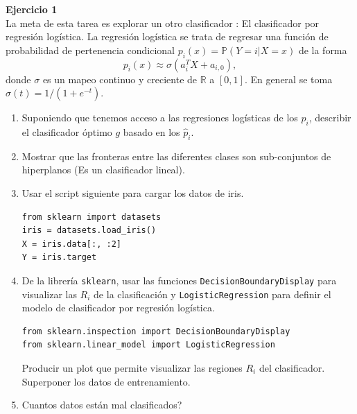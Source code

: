 \documentclass[a4paper, 11pt]{article}
\newenvironment{problem}[2][Ejercicio]
{ \begin{mdframed}[backgroundcolor= red!50] \textbf{#1 #2} \\}
	{  \end{mdframed}}
\newcommand{\prob}[1]{\mathbb{P}\left(#1\right)} %
\newcommand{\R}{\mathbb{R}} %
\begin{document}
	\setlength{\parskip}{\medskipamount}
	\setlength{\parindent}{0pt}
 

\begin{problem}{1}
La meta de esta tarea es explorar un otro clasificador : El clasificador por regresión logística. La regresión logística se trata de regresar una función de probabilidad de pertenencia condicional $p_i(x)=\prob{Y=i|X=x}$ de la forma
\[
p_i(x) \approx \sigma (a^T_{i}X+a_{i,0}),
\]
donde $\sigma$ es un mapeo continuo y creciente de $\R$ a $[0,1]$. En general se toma $\sigma(t)=1/(1+e^{-t})$.
\begin{enumerate}
    \item Suponiendo que tenemos acceso a las regresiones logísticas de los $p_i$, describir el clasificador óptimo $g$ basado en los $\hat{p}_i$.
    \item Mostrar que las fronteras entre las diferentes clases son sub-conjuntos de hiperplanos (Es un clasificador lineal).
    \item Usar el script siguiente para cargar los datos de iris.
    \begin{lstlisting}
from sklearn import datasets
iris = datasets.load_iris()
X = iris.data[:, :2]
Y = iris.target
    \end{lstlisting}
    \item De la librería \texttt{sklearn}, usar las funciones \texttt{DecisionBoundaryDisplay} para visualizar las $R_i$ de la clasificación y \texttt{LogisticRegression} para definir el modelo de clasificador por regresión logística.
    \begin{lstlisting}
from sklearn.inspection import DecisionBoundaryDisplay
from sklearn.linear_model import LogisticRegression
    \end{lstlisting}
    Producir un plot que permite visualizar las regiones $R_i$ del clasificador. Superponer los datos de entrenamiento.
    \item Cuantos datos están mal clasificados?
\end{enumerate}
\end{problem}
                
\end{document}
